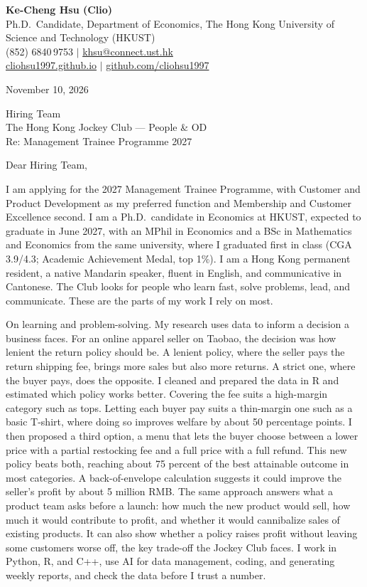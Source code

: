 \documentclass[11pt,letterpaper]{article}
\begin{document}
\noindent
{\bfseries Ke-Cheng Hsu (Clio)}\\
Ph.D.\ Candidate, Department of Economics, The Hong Kong University of Science and Technology (HKUST)\\
(852) 6840\,9753 \quad $|$ \quad \href{mailto:khsu@connect.ust.hk}{khsu@connect.ust.hk}\\
\href{https://cliohsu1997.github.io/}{cliohsu1997.github.io} \quad $|$ \quad \href{https://github.com/cliohsu1997}{github.com/cliohsu1997}

\vspace{0.7em}
\noindent
November 10, 2026

\vspace{0.35em}
\noindent
Hiring Team\\
The Hong Kong Jockey Club --- People \& OD\\
Re: Management Trainee Programme 2027

\vspace{0.2em}
Dear Hiring Team,

I am applying for the 2027 Management Trainee Programme, with Customer and Product Development as my preferred function and Membership and Customer Excellence second. I am a Ph.D.\ candidate in Economics at HKUST, expected to graduate in June 2027, with an MPhil in Economics and a BSc in Mathematics and Economics from the same university, where I graduated first in class (CGA 3.9/4.3; Academic Achievement Medal, top 1\%). I am a Hong Kong permanent resident, a native Mandarin speaker, fluent in English, and communicative in Cantonese. The Club looks for people who learn fast, solve problems, lead, and communicate. These are the parts of my work I rely on most.

On learning and problem-solving. My research uses data to inform a decision a business faces. For an online apparel seller on Taobao, the decision was how lenient the return policy should be. A lenient policy, where the seller pays the return shipping fee, brings more sales but also more returns. A strict one, where the buyer pays, does the opposite. I cleaned and prepared the data in R and estimated which policy works better. Covering the fee suits a high-margin category such as tops. Letting each buyer pay suits a thin-margin one such as a basic T-shirt, where doing so improves welfare by about 50 percentage points. I then proposed a third option, a menu that lets the buyer choose between a lower price with a partial restocking fee and a full price with a full refund. This new policy beats both, reaching about 75 percent of the best attainable outcome in most categories. A back-of-envelope calculation suggests it could improve the seller's profit by about 5 million RMB. The same approach answers what a product team asks before a launch: how much the new product would sell, how much it would contribute to profit, and whether it would cannibalize sales of existing products. It can also show whether a policy raises profit without leaving some customers worse off, the key trade-off the Jockey Club faces. I work in Python, R, and C++, use AI for data management, coding, and generating weekly reports, and check the data before I trust a number.
\end{document}
